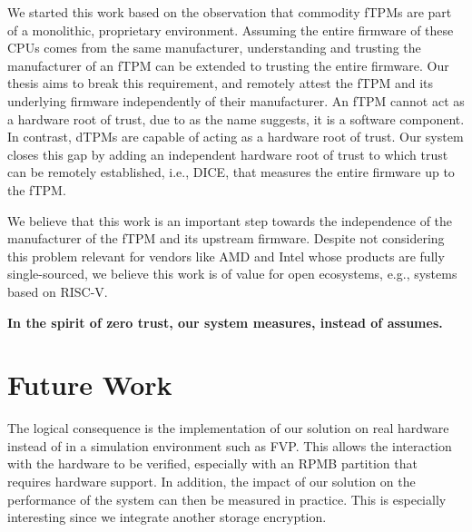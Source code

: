 We started this work based on the observation that commodity \acp{fTPM} are part of a monolithic, proprietary environment.
Assuming the entire firmware of these CPUs comes from the same manufacturer, understanding and trusting the manufacturer of an \ac{fTPM} can be extended to trusting the entire firmware.
Our thesis aims to break this requirement, and remotely attest the \ac{fTPM} and its underlying firmware independently of their manufacturer.
An \ac{fTPM} cannot act as a hardware root of trust, due to as the name suggests, it is a software component.
In contrast, \acp{dTPM} are capable of acting as a hardware root of trust.
Our system closes this gap by adding an independent hardware root of trust to which trust can be remotely established, i.e., \ac{DICE}, that measures the entire firmware up to the \ac{fTPM}.



We believe that this work is an important step towards the independence of the manufacturer of the \ac{fTPM} and its upstream firmware. %
Despite not considering this problem relevant for vendors like AMD and Intel whose products are fully single-sourced, we believe this work is of value for open ecosystems, e.g., systems based on RISC-V\@.

\textbf{In the spirit of zero trust, our system measures, instead of assumes.}

\section{Future Work}

The logical consequence is the implementation of our solution on real hardware instead of in a simulation environment such as FVP\@.
This allows the interaction with the hardware to be verified, especially with an RPMB partition that requires hardware support.
In addition, the impact of our solution on the performance of the system can then be measured in practice.
This is especially interesting since we integrate another storage encryption.

